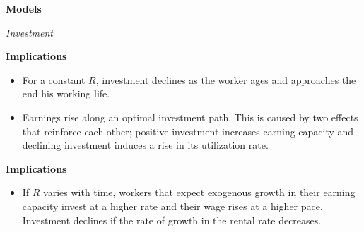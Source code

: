 \begin{frame}\begin{center}
	\LARGE\textbf{Models}
\end{center}\end{frame}

\begin{frame}\begin{center}
	\LARGE\textit{Investment}
\end{center}\end{frame}
\begin{frame}\textbf{Implications}\vspace{0.3cm}

\begin{itemize}\setlength\itemsep{1em}
\item For a constant $R$, investment declines as the worker ages and approaches the end his working life.
\item Earnings rise along an optimal investment path. This is caused by two effects that reinforce each other; positive investment increases earning capacity and declining investment induces a rise in its utilization rate.
\end{itemize}

\end{frame}
\begin{frame}\textbf{Implications}\vspace{0.3cm}

\begin{itemize}\setlength\itemsep{1em}
\item If $R$ varies with time, workers that expect exogenous growth in their earning capacity invest at a higher rate and their wage rises at a higher pace. Investment declines if the rate of growth in the rental rate decreases.
\end{itemize}

\end{frame}
